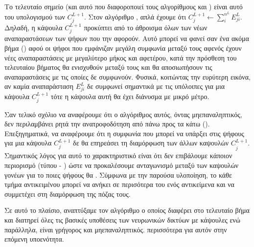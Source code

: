 Το τελευταίο σημείο (και αυτό που διαφοροποιεί τους αλγορίθμους  και ) είναι αυτό του υπολογισμού των $C_j^{L+1}$. Στον αλγόριθμο , απλά έχουμε ότι $C_j^{L+1} \gets \sum_i^{n^L} E^L_{ji}$. Δηλαδή, η κάψουλα $C_j^{L+1}$ προκύπτει από το άθροισμα όλων των νέων αναπαραστάσεων των ψήφων που την αφορούν. Αυτό μπορεί να φανεί σαν ένα ακόμα βήμα  () αφού οι ψήφοι που εμφάνιζαν μεγάλη συμφωνία μεταξύ τους αφενός έχουν νέες αναπαραστάσεις με μεγαλύτερο μήκος και αφετέρου, κατά την πρόσθεση του τελευταίου βήματος θα ενισχυθούν μεταξύ τους και θα αποσιωπήσουν τις αναπαραστάσεις με τις οποίες δε συμφωνούν. Φυσικά, κοιτώντας την ευρύτερη εικόνα, αν καμία αναπαράσταση $E^L_{ji}$ δε συμφωνεί σημαντικά με τις υπόλοιπες για μια κάψουλα $C_j^{L+1}$ τότε η κάψουλα αυτή θα έχει διάνυσμα με μικρό μέτρο.\par

Σαν τελικό σχόλιο να αναφέρουμε ότι ο αλγόριθμος αυτός, όντας μη\textendash επαναληπτικός, δεν περιλαμβάνει ρητά την ανατροφοδότηση από πάνω προς τα κάτω (). Επεξηγηματικά, να αναφέρουμε ότι η συμφωνία που μπορεί να υπάρξει στις ψήφους για μια κάψουλα $C_j^{L+1}$ δε θα επηρεάσει τη διαμόρφωση των άλλων καψουλών $C_{\grave{j}}^{L+1}$. Σημαντικός λόγος για αυτό το χαρακτηριστικό είναι ότι δεν επιβάλουμε κάποιον περιορισμό (τύπου  - ) ώστε να προκαλέσουμε ανταγωνισμό μεταξύ των καψουλών γονέων για το ποιες ψήφους θα . Σύμφωνα με την παρούσα υλοποίηση, το κάθε τμήμα αντικειμένου μπορεί να ανήκει σε περισότερα του ενός αντικείμενα και να συμμετέχει στη διαμόρφωση της πόζας τους.\par

Σε αυτό το πλαίσιο, αναπτύξαμε τον αλγόριθμο  ο οποίος διαφέρει στο τελευταίο βήμα και διατηρεί όλες τις βασικές υποθέσεις των νευρωνικών δικτύων με κάψουλες ενώ παράλληλα, είναι γρήγορος και μη\textendash επαναληπτικός. περισσότερα για αυτόν στην επόμενη υπο\textendash ενότητα.



